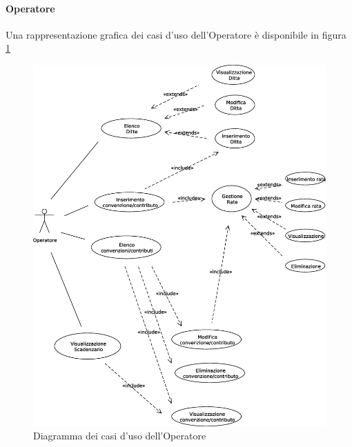 \paragraph{Operatore}
Una rappresentazione grafica dei casi d'uso dell'Operatore è disponibile in figura \ref{use_case_diag_operator}
\begin{figure}[h]
  \caption{Diagramma dei casi d'uso dell'Operatore}
  \label{use_case_diag_operator}
  \centering
    \includegraphics[width=1\textwidth]{images/casi_uso_operatore.eps}
\end{figure}

